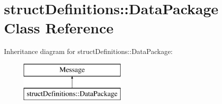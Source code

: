 \hypertarget{classstruct_definitions_1_1_data_package}{}\section{struct\+Definitions\+:\+:Data\+Package Class Reference}
\label{classstruct_definitions_1_1_data_package}
Inheritance diagram for struct\+Definitions\+:\+:Data\+Package\+:\begin{figure}[H]
\begin{center}
\leavevmode
\includegraphics[height=2.000000cm]{classstruct_definitions_1_1_data_package}
\end{center}
\end{figure}
